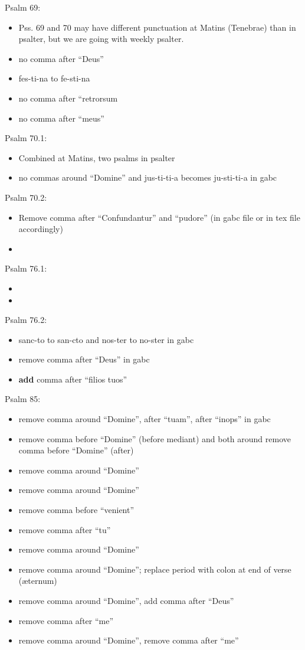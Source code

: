 \documentclass[11pt]{article}
\begin{document}
Psalm 69:
  \begin{itemize}
  \item
  Pss. 69 and 70 may have different punctuation at Matins (Tenebrae) than in psalter, but we are going with weekly psalter.
  \item
  no comma after ``Deus''
  \item
  fes-ti-na to fe-sti-na
  \item no comma after ``retrorsum
  \item  no comma after ``meus''
    \end{itemize}

Psalm 70.1:
  \begin{itemize}
  \item Combined at Matins, two psalms in psalter
  \item  no commas around ``Domine'' and jus-ti-ti-a becomes ju-sti-ti-a in gabc
    \end{itemize}

Psalm 70.2:
  \begin{itemize}
  \item Remove comma after ``Confundantur'' and ``pudore'' (in gabc file or in tex file accordingly)
  \item  
    \end{itemize}


Psalm 76.1:
  \begin{itemize}
  \item 
  \item  
    \end{itemize}

Psalm 76.2:
  \begin{itemize}
  \item sanc-to to san-cto and nos-ter to no-ster in gabc
  \item  remove comma after ``Deus'' in gabc
  \item \textbf{add} comma after ``filios tuos''
    \end{itemize}

 Psalm 85:
  \begin{itemize}
  \item remove comma around ``Domine'', after ``tuam'',  after ``inops'' in gabc
  \item  remove comma before ``Domine'' (before mediant) and both around remove comma before ``Domine'' (after)
  \item
   remove comma around ``Domine''
     \item
   remove comma around ``Domine''
     \item  remove comma before ``venient''
      \item  remove comma after ``tu''
        \item
   remove comma around ``Domine''
     \item
   remove comma around ``Domine''; replace period with colon at end of verse (æternum)
           \item
   remove comma around ``Domine'', add comma after ``Deus''
    \item  remove comma after ``me''
       \item  remove comma around ``Domine'', remove comma after ``me''
       \end{itemize}
\end{document}
